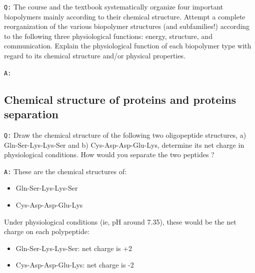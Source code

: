 \documentclass[11pt, a4paper,titlepage]{article}
\begin{document}
\texttt{Q:} The course and the textbook systematically organize four important
biopolymers mainly according to their chemical structure. Attempt a
complete reorganization of the various biopolymer structures (and
subfamilies!) according to the following three physiological
functions: energy, structure, and communication. Explain the
physiological function of each biopolymer type with regard to its
chemical structure and/or physical properties.

\texttt{A:}
\subsection{Chemical structure of proteins and proteins separation}
\label{sec-2-2}

\texttt{Q:} Draw the chemical structure of the following two oligopeptide
structures, a) Gln-Ser-Lys-Lys-Ser and b) Cys-Asp-Asp-Glu-Lys,
determine its net charge in physiological conditions. How would you
separate the two peptides ?  

\texttt{A:} These are the chemical structures of:
\begin{itemize}
\item Gln-Ser-Lys-Lys-Ser

  \setatomsep{25pt}
\item Cys-Asp-Asp-Glu-Lys

  \setatomsep{25pt}
\end{itemize}

Under physiological conditions (ie, pH around 7.35), these would be
the net charge on each polypeptide:

\begin{itemize}
\item Gln-Ser-Lys-Lys-Ser: net charge is +2

\item Cys-Asp-Asp-Glu-Lys: net charge is -2

\end{itemize}
\end{document}
